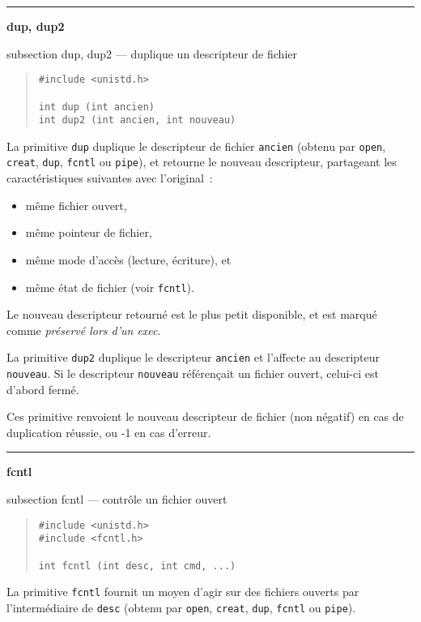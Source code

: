 \documentclass [twoside] {report}
\newcommand {\primitive} [1]
    {
	\phantomsection
	{\large \textbf {#1}}
	\addcontentsline {toc} {subsection} {#1}
    }
\newcommand {\separation}
    {
	\vspace {5mm}
	\nopagebreak
	\hrule
    }
\begin{document}
\separation
\primitive {dup, dup2} --- duplique un descripteur de fichier

\begin {quote}
\begin {verbatim}
#include <unistd.h>

int dup (int ancien)
int dup2 (int ancien, int nouveau)
\end{verbatim}
\end {quote}

La primitive \texttt {dup} duplique le descripteur de
fichier \texttt {ancien} (obtenu par \texttt {open}, \texttt {creat},
\texttt {dup}, \texttt {fcntl} ou \texttt {pipe}), et retourne le
nouveau descripteur, partageant les
caractéristiques suivantes avec l'original~:

\begin {itemize}
    \item même fichier ouvert,
    \item même pointeur de fichier,
    \item même mode d'accès (lecture, écriture), et
    \item même état de fichier (voir \texttt {fcntl}).
\end {itemize}

Le nouveau descripteur retourné est le plus petit
disponible, et est marqué comme \textit {préservé lors
d'un exec}.

La primitive \texttt {dup2} duplique le descripteur \texttt {ancien} et
l'affecte au descripteur \texttt {nouveau}. Si le descripteur \texttt {nouveau}
référençait un fichier ouvert, celui-ci est d'abord fermé.

Ces primitive renvoient le nouveau descripteur de fichier
(non négatif) en cas de duplication
réussie, ou -1 en cas d'erreur.




\separation
\primitive {fcntl} --- contrôle un fichier ouvert

\begin {quote}
\begin {verbatim}
#include <unistd.h>
#include <fcntl.h>

int fcntl (int desc, int cmd, ...)
\end{verbatim}
\end {quote}

La primitive \texttt {fcntl} fournit un moyen
d'agir sur des fichiers ouverts par
l'intermédiaire de
\texttt {desc} (obtenu par \texttt {open}, \texttt {creat}, \texttt {dup},
\texttt {fcntl} ou \texttt {pipe}).
\end{document}
